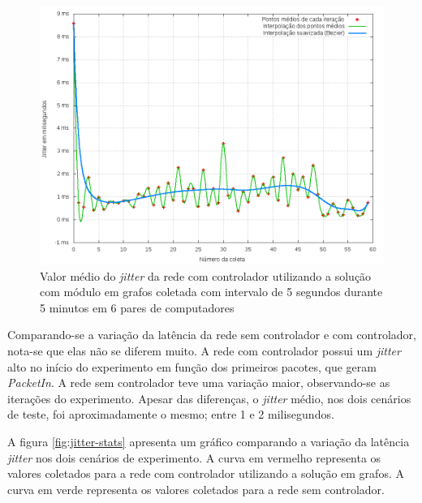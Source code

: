 \begin{figure}[!htb]
    \centering
    \label{fig:jitter-ctrl}
    \includegraphics[width=\linewidth]{img/jitter-ctrl}
    \caption{Valor médio do \emph{jitter} da rede com controlador utilizando a
    solução com módulo em grafos coletada com intervalo de 5 segundos durante 5
    minutos em 6 pares de computadores}
\end{figure}

Comparando-se a variação da latência da rede sem controlador e com controlador,
nota-se que elas não se diferem muito.
A rede com controlador possui um \emph{jitter} alto no início do experimento
em função dos primeiros pacotes, que geram \emph{PacketIn}.
A rede sem controlador teve uma variação maior, observando-se as iterações 
do experimento.
Apesar das diferenças, o \emph{jitter} médio, nos dois cenários de teste, 
foi aproximadamente o mesmo; entre 1 e 2 milisegundos.

A figura \ref{fig:jitter-stats} apresenta um gráfico comparando a variação da 
latência \emph{jitter} nos dois cenários de experimento.
A curva em vermelho representa os valores coletados para a rede com controlador
utilizando a solução em grafos.
A curva em verde representa os valores coletados para a rede sem controlador.

\break

